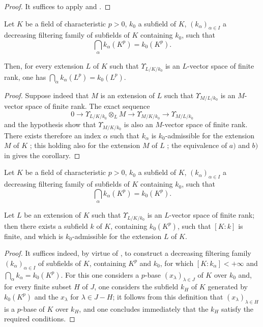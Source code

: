 \begin{proof}
It suffices to apply  and .
\end{proof}

\begin{corollary}[21.8.5]
\label{0.21.8.5}
Let $K$ be a field of characteristic $p>0$, $k_0$ a subfield of $K$, $(k_\alpha)_{\alpha\in I}$ a decreasing filtering family of subfields of $K$ containing $k_0$, such that
\[
  \bigcap_\alpha k_\alpha(K^p)=k_0(K^p).
\]

Then, for every extension $L$ of $K$ such that $\Upsilon_{L/K/k_0}$ is an $L$-vector space of finite rank, one has $\bigcap_\alpha k_\alpha(L^p)=k_0(L^p)$.
\end{corollary}

\begin{proof}
Suppose indeed that $M$ is an extension of $L$ such that $\Upsilon_{M/L/k_0}$ is an $M$-vector space of finite rank.
The exact sequence 
\[
  0\to\Upsilon_{L/K/k_0}\otimes_L M\to\Upsilon_{M/K/k_0}\to\Upsilon_{M/L/k_0}
\]
and the hypothesis show that $\Upsilon_{M/K/k_0}$ is also an $M$-vector space of finite rank.
There exists therefore an index $\alpha$ such that $k_\alpha$ is $k_0$-admissible for the extension $M$ of $K$ ; this holding also for the extension $M$ of $L$ ; the equivalence of $a)$ and $b)$ in  gives the corollary.
\end{proof}

\begin{corollary}[21.8.6]
\label{0.21.8.6}
Let $K$ be a field of characteristic $p>0$, $k_0$ a subfield of $K$, $(k_\alpha)_{\alpha\in I}$ a decreasing filtering family of subfields of $K$ containing $k_0$, such that
\[
  \bigcap_\alpha k_\alpha(K^p)=k_0(K^p).
\]

Let $L$ be an extension of $K$ such that $\Upsilon_{L/K/k_0}$ is an $L$-vector space of finite rank; then there exists a subfield $k$ of $K$, containing $k_0(K^p)$, such that $[K:k]$ is finite, and which is $k_0$-admissible for the extension $L$ of $K$.
\end{corollary}

\begin{proof}
It suffices indeed, by virtue of , to construct a decreasing filtering family $(k_\alpha)_{\alpha\in I}$ of subfields of $K$, containing $K^p$ and $k_0$, for which $[K:k_\alpha]<+\infty$ and $\bigcap_\alpha k_\alpha=k_0(K^p)$.
For this one considers a $p$-base $(x_\lambda)_{\lambda\in J}$ of $K$ over $k_0$ and, for every finite subset $H$ of $J$, one considers the subfield $k_H$ of $K$ generated by $k_0(K^p)$ and the $x_\lambda$ for $\lambda\in J-H$; it follows from this definition that $(x_\lambda)_{\lambda\in H}$ is a $p$-base of $K$ over $k_H$, and one concludes immediately that the $k_H$ satisfy the required conditions.
\end{proof}


